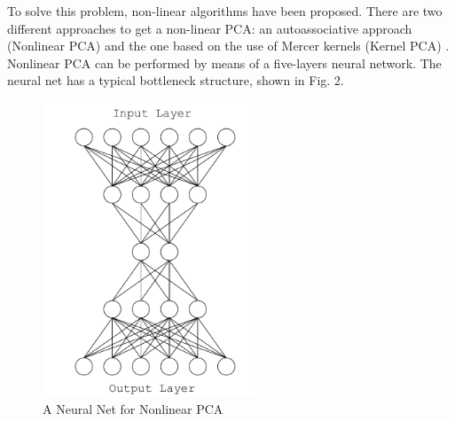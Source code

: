 \documentclass[journal]{IEEEtran}
\begin{document}
To solve this problem, non-linear algorithms have been proposed. There are two different approaches to get a non-linear PCA: 
an autoassociative approach (Nonlinear PCA) \cite{Kirby01} and the one based on the use of Mercer kernels (Kernel PCA) \cite{Muller98}. 
Nonlinear PCA can be performed by means of a five-layers neural network. 
The neural net has a typical bottleneck structure, shown in Fig. 2. 

\begin{figure}[!t]
  \centering
  \includegraphics[width=2.5in]{fig-2.png}
  \caption{A Neural Net for Nonlinear PCA}
  \label{fig_sim_2}
\end{figure}
\end{document}

